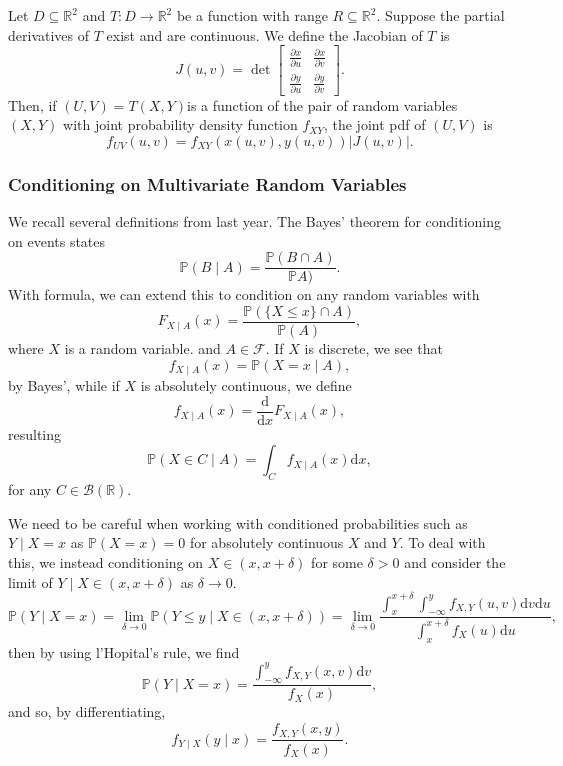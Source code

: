 \documentclass[
]{article}
\theoremstyle{definition}
\begin{document}
Let \(D \subseteq \mathbb{R}^2\) and \(T : D \to \mathbb{R}^2\) be a
function with range \(R \subseteq \mathbb{R}^2\). Suppose the partial
derivatives of \(T\) exist and are continuous. We define the Jacobian of
\(T\) is \[J(u, v) = \det\begin{bmatrix}
  \frac{\partial{x}}{\partial{u}} & \frac{\partial{x}}{\partial{v}}\\
  \frac{\partial{y}}{\partial{u}} & \frac{\partial{y}}{\partial{v}}
\end{bmatrix}.\] Then, if \((U, V) = T(X, Y)\)is a function of the pair
of random variables \((X, Y)\) with joint probability density function
\(f_{XY}\), the joint pdf of \((U, V)\) is
\[f_{UV}(u, v) = f_{XY}(x(u, v), y(u, v))\left|J(u, v)\right|.\]

\hypertarget{conditioning-on-multivariate-random-variables}{%
\subsubsection{Conditioning on Multivariate Random
Variables}\label{conditioning-on-multivariate-random-variables}}

We recall several definitions from last year. The Bayes' theorem for
conditioning on events states
\[\mathbb{P}(B \mid A) = \frac{\mathbb{P}(B \cap A)}{\mathbb{P}A)}.\]
With formula, we can extend this to condition on any random variables
with
\[F_{X \mid A}(x) =\frac{\mathbb{P}(\{X \le x\} \cap A)}{\mathbb{P}(A)},\]
where \(X\) is a random variable. and \(A \in \mathcal{F}\). If \(X\) is
discrete, we see that \[f_{X \mid A}(x) = \mathbb{P}(X = x \mid A),\] by
Bayes', while if \(X\) is absolutely continuous, we define
\[f_{X \mid A}(x) = \frac{\text{d}}{\text{d}x}F_{X \mid A}(x),\]
resulting
\[\mathbb{P}(X \in C \mid A) = \int_{C} f_{X \mid A}(x) \text{d}x,\] for
any \(C \in \mathcal{B}(\mathbb{R})\).

We need to be careful when working with conditioned probabilities such
as \(Y \mid X = x\) as \(\mathbb{P}(X = x) = 0\) for absolutely
continuous \(X\) and \(Y\). To deal with this, we instead conditioning
on \(X \in (x, x + \delta)\) for some \(\delta > 0\) and consider the
limit of \(Y \mid X \in (x, x + \delta)\) as \(\delta \to 0\).
\[\mathbb{P}(Y \mid X = x)
  = \lim_{\delta \to 0}\mathbb{P}(Y \le y \mid X \in (x, x + \delta)) 
  = \lim_{\delta \to 0}
    \frac{\int_x^{x + \delta} \int_{-\infty}^y f_{X, Y}(u, v) \text{d}v \text{d}u}
    {\int_x^{x + \delta} f_X(u)\text{d}u},
\] then by using l'Hopital's rule, we find \[\mathbb{P}(Y \mid X = x) = 
  \frac{\int_{-\infty}^y f_{X, Y}(x, v) \text{d}v}{f_X(x)},\] and so, by
differentiating,
\[f_{Y \mid X}(y \mid x) = \frac{f_{X, Y}(x, y)}{f_X(x)}.\]
\end{document}
